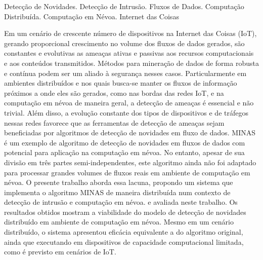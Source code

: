 \begin{resumo}{Detecção de Novidades. Detecção de Intrusão. Fluxos de Dados.
   Computação Distribuída. Computação em Névoa. Internet das Coisas}

   Em um cenário de crescente número de dispositivos na Internet das Coisas
   (IoT), gerando proporcional crescimento no volume dos fluxos de dados
   gerados,
   são constantes e evolutivas as ameaças ativas e passivas aos recursos
   computacionais e aos conteúdos transmitidos.
   Métodos para mineração de dados de forma robusta e contínua podem ser um
   aliado à segurança nesses casos.
   Particularmente em ambientes distribuídos e nos quais busca-se manter os
   fluxos de informação próximos a onde eles são gerados, como nas bordas das
   redes IoT, e na computação em névoa de maneira geral, a detecção de ameaças é
   essencial e não trivial.
   Além disso, a evolução constante dos tipos de dispositivos e de tráfegos
   nessas redes favorece que as ferramentas de detecção de ameaças sejam
   beneficiadas por algoritmos de detecção de novidades em fluxo de dados.
   MINAS é um exemplo de algoritmo de detecção de novidades em fluxos de dados
   com potencial para aplicação na computação em névoa.
   No entanto, apesar de sua divisão em três partes semi-independentes, este
   algoritmo ainda não foi adaptado para processar grandes volumes de fluxos
   reais em ambiente de computação em névoa.
   O presente trabalho aborda essa lacuna, propondo um sistema
   que implementa o algoritmo MINAS de maneira distribuída num contexto
   de detecção de intrusão e computação em névoa.
   e avaliada neste trabalho.
   Os resultados obtidos mostram a viabilidade do modelo de detecção de
   novidades distribuído em ambiente de computação em névoa.
   Mesmo em um cenário distribuído, o sistema apresentou eficácia equivalente a
   do algoritmo original, ainda que executando em dispositivos de capacidade
   computacional limitada, como é previsto em cenários de IoT.

\end{resumo}

